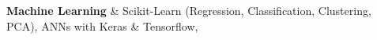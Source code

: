\textbf{Machine Learning} & 
Scikit-Learn (Regression, 
    Classification, 
    Clustering, 
    PCA), 
ANNs with Keras \& Tensorflow, 
